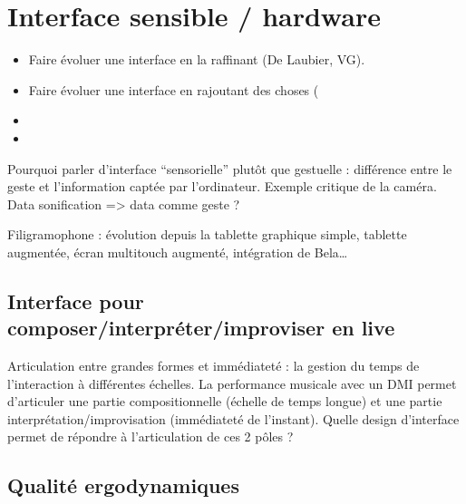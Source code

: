 %
\chapter{Interface sensible / hardware}
\label{ch:interfaces}




\vspace{-1em}
\begin{itemize}[noitemsep]
\item Faire évoluer une interface en la raffinant (De Laubier, VG).
\item Faire évoluer une interface en rajoutant des choses (
\item 
\item 

\end{itemize}



Pourquoi parler d’interface “sensorielle” plutôt que gestuelle : différence entre le geste et l’information captée par l’ordinateur. Exemple critique de la caméra. Data sonification => data comme geste ?

Filigramophone : évolution depuis la tablette graphique simple, tablette augmentée, écran multitouch augmenté, intégration de Bela…

\section{Interface pour composer/interpréter/improviser en live}
Articulation entre grandes formes et immédiateté : la gestion du temps de l’interaction à différentes échelles.
La performance musicale avec un DMI permet d’articuler une partie compositionnelle (échelle de temps longue) et une partie interprétation/improvisation (immédiateté de l’instant). 
Quelle design d’interface permet de répondre à l’articulation de ces 2 pôles ? 

\section{Qualité ergodynamiques}
